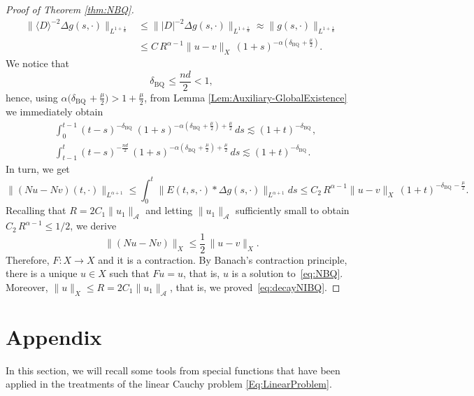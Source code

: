 \documentclass[10pt]{article}
\newcommand{\<}{\langle}
\renewcommand{\>}{\rangle}
\numberwithin{equation}{section}
\newcommand{\BQ}{{\mathrm{BQ\,}}}
\begin{document}
\begin{proof}[Proof of Theorem \ref{thm:NBQ}]
%
\[ \begin{split}
\|\<D\>^{-2}\Delta g(s,\cdot)\|_{L^{1+\frac1\alpha}}
    & \leq \||D|^{-2}\Delta g(s,\cdot)\|_{L^{1+\frac1\alpha}} \approx \|g(s,\cdot)\|_{L^{1+\frac1\alpha}} \\
    & \leq C\,R^{\alpha-1} \|u-v\|_X\,(1+s)^{-\alpha\left(\delta_\BQ+\frac{\mu}2\right)}.
\end{split} \]
%
We notice that
%
\[ \delta_\BQ \leq \frac{nd}2<1, \]
%
hence, using $\alpha\big(\delta_\BQ+\frac{\mu}2\big)>1+\frac{\mu}2$, from Lemma \ref{Lem:Auxiliary-GlobalExistence} we immediately obtain
%
\[ \begin{split}
& \int_0^{t-1} (t-s)^{-\delta_\BQ}\,(1+s)^{-\alpha\left(\delta_\BQ+\frac{\mu}2\right)+\frac{\mu}2}\,ds \lesssim (1+t)^{-\delta_\BQ},\\
& \int_{t-1}^t (t-s)^{-\frac{nd}2}\,(1+s)^{-\alpha\left(\delta_\BQ+\frac{\mu}2\right)+\frac{\mu}2}\,ds   \lesssim (1+t)^{-\delta_\BQ}.
\end{split} \]
%
In turn, we get
%
\[ \|(Nu-Nv)(t,\cdot)\|_{L^{\alpha+1}}\leq \int_0^t \| E(t,s, \cdot)\ast \Delta g(s,\cdot)\|_{L^{\alpha+1}} ds \leq C_2\,R^{\alpha-1} \|u-v\|_X\,(1+t)^{-\delta_\BQ-\frac{\mu}2}. \]
%
Recalling that $R=2C_1\|u_1\|_{\mathcal A}$ and letting $\|u_1\|_{\mathcal A}$ sufficiently small to obtain $C_2\,R^{\alpha-1}\leq 1/2$, we derive
%
\[ \|(Nu-Nv)\|_X \leq \frac12\,\|u-v\|_X. \]
%
Therefore, $F:X\to X$ and it is a contraction. By Banach's contraction principle, there is a unique $u\in X$ such that $Fu=u$, that is, $u$ is a solution to~\eqref{eq:NBQ}. Moreover, $\|u\|_X \leq R=2C_1\|u_1\|_{\mathcal A}$, that is, we proved~\eqref{eq:decayNIBQ}.
\end{proof}
%


\section*{Appendix}
\renewcommand{\thesection}{A}
\setcounter{equation}{0}
\setcounter{proposition}{0}
\setcounter{lemma}{0}
In this section, we will recall some tools from special functions that have been applied in the treatments of the linear Cauchy problem \eqref{Eq:LinearProblem}.
\end{document}
